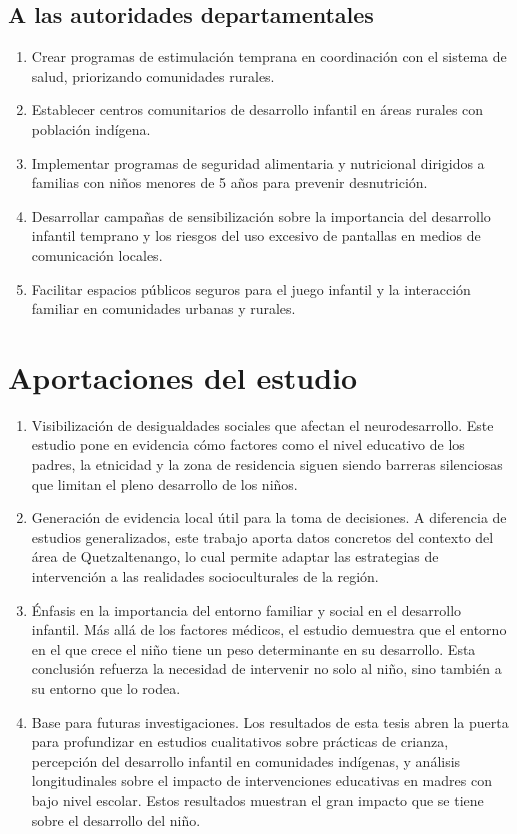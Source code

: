 \subsection*{A las autoridades departamentales}
\begin{enumerate}
\item Crear programas de estimulación temprana en coordinación 
con el sistema de salud, priorizando comunidades rurales.

\item Establecer centros comunitarios de desarrollo infantil en áreas 
rurales con población indígena.

\item Implementar programas de seguridad alimentaria y nutricional 
dirigidos a familias con niños menores de 5 años para prevenir 
desnutrición.

\item Desarrollar campañas de sensibilización sobre la importancia del 
desarrollo infantil temprano y los riesgos del uso excesivo de pantallas 
en medios de comunicación locales.

\item Facilitar espacios públicos seguros para el juego infantil y la 
interacción familiar en comunidades urbanas y rurales.
\end{enumerate}

\section{Aportaciones del estudio}
\begin{enumerate}
\item Visibilización de desigualdades sociales que afectan el neurodesarrollo. 
Este estudio pone en evidencia cómo factores como el nivel educativo de los 
padres, la etnicidad y la zona de residencia siguen siendo barreras silenciosas 
que limitan el pleno desarrollo de los niños. 

\item Generación de evidencia local útil para la toma de decisiones. A 
diferencia de estudios generalizados, este trabajo aporta datos concretos del 
contexto del área de Quetzaltenango, lo cual permite adaptar las estrategias 
de intervención a las realidades socioculturales de la región.

\item Énfasis en la importancia del entorno familiar y social en el desarrollo 
infantil. Más allá de los factores médicos, el estudio demuestra que el 
entorno en el que crece el niño tiene un peso determinante en su desarrollo. 
Esta conclusión refuerza la necesidad de intervenir no solo al niño, sino 
también a su entorno que lo rodea. 

\item Base para futuras investigaciones. Los resultados de esta tesis abren la 
puerta para profundizar en estudios cualitativos sobre prácticas de crianza, 
percepción del desarrollo infantil en comunidades indígenas, y análisis 
longitudinales sobre el impacto de intervenciones educativas en madres con 
bajo nivel escolar. Estos resultados muestran el gran impacto que se tiene 
sobre el desarrollo del niño. 
\end{enumerate}
